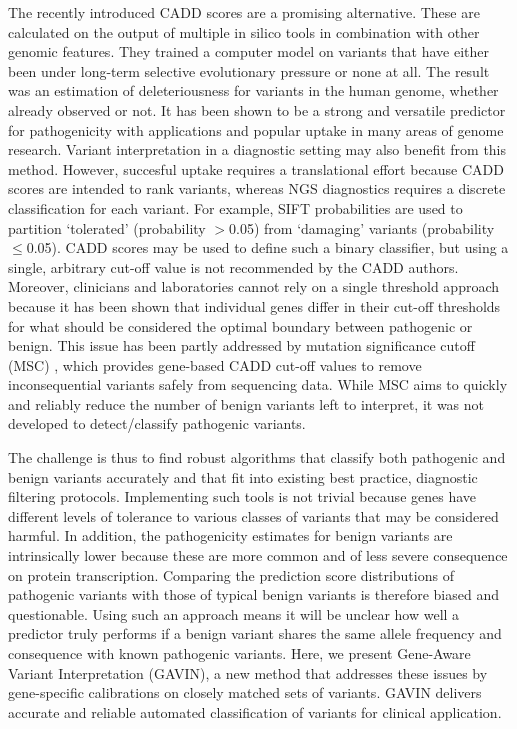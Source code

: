 The recently introduced CADD\cite{Kircher_2014} scores are a promising al\-ter\-na\-ti\-ve\cite{van_der_Velde_2015}.
These are calculated on the output of multiple in silico tools in combination with other genomic features.
They trained a computer model on variants that have either been under long-term selective evolutionary pressure or none at all.
The result was an estimation of deleteriousness for variants in the human genome, whether already observed or not.
It has been shown to be a strong and versatile predictor for pathogenicity\cite{Kircher_2014} with applications and popular uptake in many areas of genome research.
Variant interpretation in a diagnostic setting may also benefit from this method.
However, succesful uptake requires a translational effort because CADD scores are intended to rank variants, whereas NGS diagnostics requires a discrete classification for each variant.
For example, SIFT\cite{Kumar_2009} probabilities are used to partition ‘tolerated’ (probability $>$0.05) from ‘damaging’ variants (probability $\leq$0.05).
CADD scores may be used to define such a binary classifier, but using a single, arbitrary cut-off value is not recommended by the CADD authors\cite{CaddSite}.
Moreover, clinicians and laboratories cannot rely on a single threshold approach because it has been shown that individual genes differ in their cut-off thresholds for what should be considered the optimal boundary between pathogenic or benign\cite{van_der_Velde_2015}.
This issue has been partly addressed by mutation significance cutoff (MSC) \cite{Itan_2016}, which provides gene-based CADD cut-off values to remove inconsequential variants safely from sequencing data.
While MSC aims to quickly and reliably reduce the number of benign variants left to interpret, it was not developed to detect/classify pathogenic variants.

The challenge is thus to find robust algorithms that classify both pathogenic and benign variants accurately and that fit into existing best practice, diagnostic filtering protocols\cite{Richards_2015}.
Implementing such tools is not trivial because genes have different levels of tolerance to various classes of variants that may be considered harmful\cite{Lek_2016}.
In addition, the pathogenicity estimates for benign variants are intrinsically lower because these are more common and of less severe consequence on protein transcription.
Comparing the prediction score distributions of pathogenic variants with those of typical benign variants is therefore biased and questionable.
Using such an approach means it will be unclear how well a predictor truly performs if a benign variant shares the same allele frequency and consequence with known pathogenic variants.
Here, we present Gene-Aware Variant Interpretation (GAVIN), a new method that addresses these issues by gene-specific calibrations on closely matched sets of variants.
GAVIN delivers accurate and reliable automated classification of variants for clinical application.


